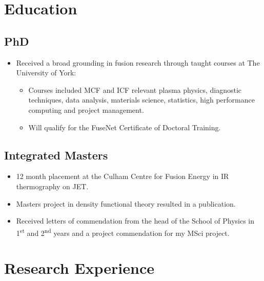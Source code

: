 \documentclass[11pt,a4paper,sans]{moderncv}        %
\begin{document}
\makecvtitle

\section{Education}
\subsection{PhD}
{\begin{itemize}%
\item Received a broad grounding in fusion research through taught courses at The University of York:%
\begin{itemize}
\item Courses included MCF and ICF relevant plasma physics, diagnostic techniques, data analysis, materials science, statistics, high performance computing and project management.
\item Will qualify for the FuseNet Certificate of Doctoral Training.
\end{itemize}
\end{itemize}}
\subsection{Integrated Masters}
{\begin{itemize}%
\item 12 month placement at the Culham Centre for Fusion Energy in IR thermography on JET.%
\item Masters project in density functional theory resulted in a publication.
\item Received letters of commendation from the head of the School of Physics in 1\textsuperscript{st} and 2\textsuperscript{nd} years and a project commendation for my MSci project.
\end{itemize}}

\section{Research Experience}
\end{document}
